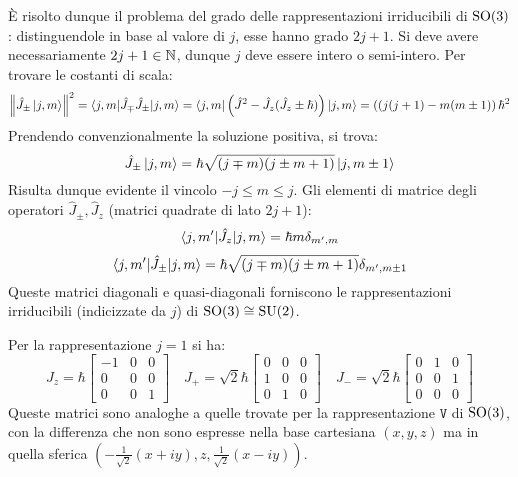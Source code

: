 È risolto dunque il problema del grado delle rappresentazioni irriducibili di $ \mathrm{SO}(3) $: distinguendole in base al valore di $ j $, esse hanno grado $ 2j + 1 $. Si deve avere necessariamente $ 2j + 1 \in \mathbb{N} $, dunque $ j $ deve essere intero o semi-intero.
Per trovare le costanti di scala:
\begin{equation*}
	\left\lVert \hat{J}_{\pm} \ket{j,m} \right\rVert^2 = \braket{j,m | \hat{J}_{\mp} \hat{J}_{\pm} | j,m} = \braket{j,m | \left( \hat{J}^2 - \hat{J}_z (\hat{J}_z \pm \hbar) \right) | j,m} = \left( (j (j + 1) - m (m \pm 1) \right) \hbar^2
\end{equation*}
Prendendo convenzionalmente la soluzione positiva, si trova:
\begin{equation}
	\hat{J}_{\pm} \ket{j,m} = \hbar \sqrt{(j \mp m) (j \pm m + 1)} \ket{j, m \pm 1}
	\label{eq:9.21}
\end{equation}
Risulta dunque evidente il vincolo $ -j \le m \le j $. Gli elementi di matrice degli operatori $ \hat{J}_{\pm}, \hat{J}_z $ (matrici quadrate di lato $ 2j + 1 $):
\begin{equation}
	\braket{j,m' | \hat{J}_z | j,m} = \hbar m \delta_{m',m}
	\label{eq:9.22}
\end{equation}
\begin{equation}
	\braket{j,m' | \hat{J}_{\pm} | j,m} = \hbar \sqrt{(j \mp m) (j \pm m + 1)} \delta_{m',m \pm 1}
	\label{eq:9.23}
\end{equation}
Queste matrici diagonali e quasi-diagonali forniscono le rappresentazioni irriducibili (indicizzate da $ j $) di $ \mathrm{SO}(3) \cong \mathrm{SU}(2) $.

\begin{example}
	Per la rappresentazione $ j = 1 $ si ha:
	\begin{equation*}
		J_z = \hbar
		\begin{bmatrix}
			-1 & 0 & 0 \\
			0 & 0 & 0 \\
			0 & 0 & 1
		\end{bmatrix}
		\quad
		J_+ = \sqrt{2} \hbar
		\begin{bmatrix}
			0 & 0 & 0 \\
			1 & 0 & 0 \\
			0 & 1 & 0
		\end{bmatrix}
		\quad
		J_- = \sqrt{2} \hbar
		\begin{bmatrix}
			0 & 1 & 0 \\
			0 & 0 & 1 \\
			0 & 0 & 0
		\end{bmatrix}
	\end{equation*}
	Queste matrici sono analoghe a quelle trovate per la rappresentazione $ \mathtt{V} $ di $ \mathrm{SO}(3) $, con la differenza che non sono espresse nella base cartesiana $ (x,y,z) $ ma in quella sferica $ (-\frac{1}{\sqrt{2}}(x + iy), z, \frac{1}{\sqrt{2}} (x - iy)) $.
\end{example}

